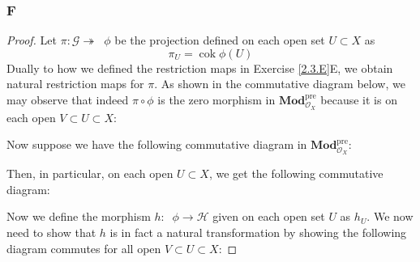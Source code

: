 \documentclass{article}
\newcommand{\fO}{\mathscr{O}}
\newcommand{\fF}{\mathscr{F}}
\newcommand{\fG}{\mathscr{G}}
\newcommand{\fH}{\mathscr{H}}
\DeclareMathOperator{\res}{res}
\DeclareMathOperator{\cok}{cok}
\DeclareMathOperator{\cokpre}{\cok_{\text{pre}}}
\newcommand{\Mod}{\mathbf{Mod}} %
\begin{document}
\subsubsection{F}\label{2.3.F}
\begin{proof}
    Let $\pi:\fG\twoheadrightarrow \cokpre \phi$ be the projection defined on each open set $U\subset X$ as
    \[
    \pi_U=\cok \phi(U)
    \]
    Dually to how we defined the restriction maps in Exercise \ref{2.3.E}E, we obtain natural restriction maps for $\pi$. As shown in the commutative diagram below, we may observe that indeed $\pi \circ \phi$ is the zero morphism in $\Mod_{\fO_X}^{\text{pre}}$ because it is on each open $V\subset U\subset X$:
    \begin{center}
    \end{center}
    Now suppose we have the following commutative diagram in $\Mod_{\fO_X}^{\text{pre}}$:
    \begin{center}
    \end{center}
    Then, in particular, on each open $U\subset X$, we get the following commutative diagram:
    \begin{center}
    \end{center}
    Now we define the morphism $h:\cokpre \phi \to \fH$ given on each open set $U$ as $h_U$. We now need to show that $h$ is in fact a natural transformation by showing the following diagram commutes for all open $V\subset U\subset X$:

\end{proof}
\end{document}
